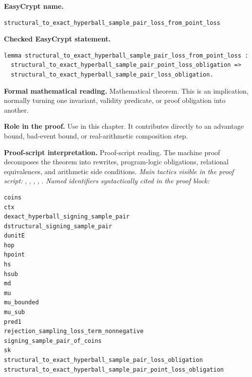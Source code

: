 \begin{formaltheorem}
\noindent\textbf{EasyCrypt name.}
\begin{lstlisting}[language=EasyCrypt,basicstyle=\ttfamily\scriptsize]
structural_to_exact_hyperball_sample_pair_loss_from_point_loss
\end{lstlisting}
\noindent\textbf{Checked EasyCrypt statement.}
\begin{lstlisting}[language=EasyCrypt,basicstyle=\ttfamily\scriptsize]
lemma structural_to_exact_hyperball_sample_pair_loss_from_point_loss :
  structural_to_exact_hyperball_sample_pair_point_loss_obligation =>
  structural_to_exact_hyperball_sample_pair_loss_obligation.
\end{lstlisting}
\noindent\textbf{Formal mathematical reading.}
Mathematical theorem. This is an implication, normally turning one invariant, validity predicate, or proof obligation into another.

\noindent\textbf{Role in the proof.}
Use in this chapter. It contributes directly to an advantage bound, bad-event bound, or real-arithmetic composition step.

\noindent\textbf{Proof-script interpretation.}
Proof-script reading. The machine proof decomposes the theorem into rewrites, program-logic obligations, relational equivalences, and arithmetic side conditions.
\emph{Main tactics visible in the proof script:} , , , , .
\emph{Named identifiers syntactically cited in the proof block:}
\begin{lstlisting}[language=EasyCrypt,basicstyle=\ttfamily\scriptsize]
coins
ctx
dexact_hyperball_signing_sample_pair
dstructural_signing_sample_pair
dunitE
hop
hpoint
hs
hsub
md
mu
mu_bounded
mu_sub
pred1
rejection_sampling_loss_term_nonnegative
signing_sample_pair_of_coins
sk
structural_to_exact_hyperball_sample_pair_loss_obligation
structural_to_exact_hyperball_sample_pair_point_loss_obligation
\end{lstlisting}

\end{formaltheorem}


